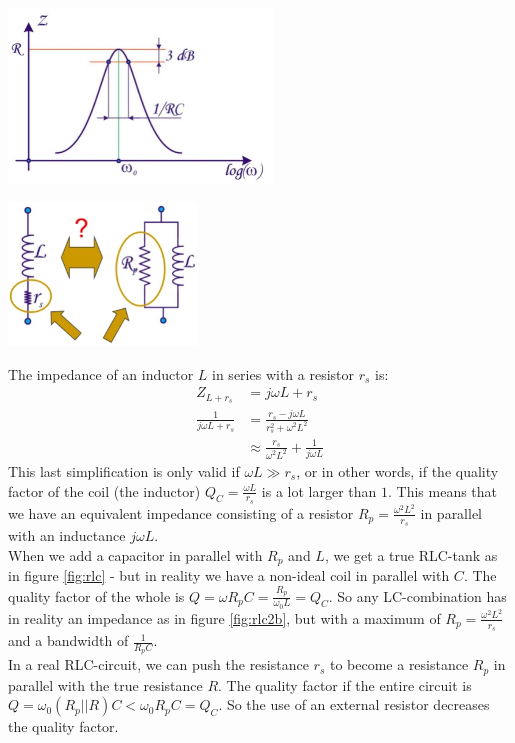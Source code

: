 \begin{minipage}{.5\textwidth}
	\centering
	\includegraphics[width=7cm]{figures/ch09/rlc2.jpg}
	\label{fig:rlc2b}
\end{minipage}%
\begin{minipage}{.5\textwidth}
	\centering
	\includegraphics[width=5cm]{figures/ch09/selective1.jpg}
	\label{fig:selective1}
\end{minipage}
The impedance of an inductor $L$ in series with a resistor $r_s$ is:
\begin{align*}
	Z_{L + r_s} &= j \omega L + r_s \\
	\frac{1}{j \omega L + r_s} &= \frac{r_s - j \omega L}{r_s^2 + \omega^2 L^2} \\
		&\approx \frac{r_s}{\omega^2 L^2} + \frac{1}{j\omega L}
\end{align*}
This last simplification is only valid if $\omega L \gg r_s$, or in other words, if the quality factor of the coil (the inductor) $Q_C = \frac{\omega L}{r_s}$ is a lot larger than $1$. This means that we have an equivalent impedance consisting of a resistor $R_p = \frac{\omega^2 L^2}{r_s}$ in parallel with an inductance $j\omega L$.\\
When we add a capacitor in parallel with $R_p$ and $L$, we get a true RLC-tank as in figure \ref{fig:rlc} - but in reality we have a non-ideal coil in parallel with $C$. The quality factor of the whole is $Q = \omega R_p C = \frac{R_p}{\omega_0 L} = Q_C$. So any LC-combination has in reality an impedance as in figure \ref{fig:rlc2b}, but with a maximum of $R_p = \frac{\omega^2 L^2}{r_s}$ and a bandwidth of $\frac{1}{R_p C}$.\\
In a real RLC-circuit, we can push the resistance $r_s$ to become a resistance $R_p$ in parallel with the true resistance $R$. The quality factor if the entire circuit is $Q = \omega_0 (R_p || R) C <  \omega_0 R_p C = Q_C$. So the use of an external resistor decreases the quality factor.\\

